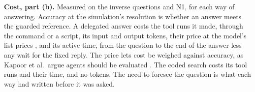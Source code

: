   \textbf{Cost, part (b).} Measured on the inverse questions and N1, for each way of answering.
  Accuracy at the simulation's resolution is whether an answer meets the guarded reference. A
  delegated answer costs the tool runs it made, through the command or a script, its input and
  output tokens, their price at the model's list prices \cite{anthropic2026pricing}, and its
  active time, from the question to the end of the answer less any wait for the fixed reply. The
  price lets cost be weighed against accuracy, as Kapoor et al.\ argue agents should be evaluated
  \cite{kapoor2025agents}. The coded search costs its tool runs and their time, and no tokens. The need to foresee
  the question is what each way had written before it was asked.
